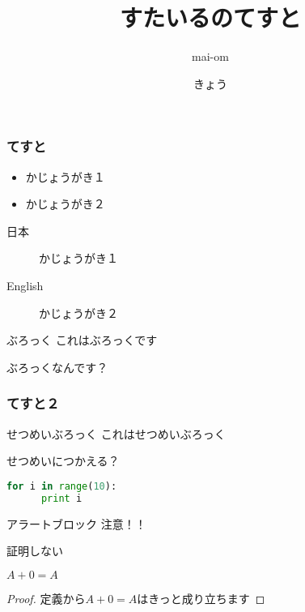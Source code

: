 \documentclass[17pt,aspectratio=1610,cjk, xelatex]{beamer}
\title{すたいるのてすと}
\author{mai-om}
\date{きょう}
\begin{document}
\maketitle{}

\begin{frame}
  \frametitle{てすと}
  
  \begin{itemize}
      \item かじょうがき１
      \item かじょうがき２
  \end{itemize}

  \begin{description}
      \item[日本] かじょうがき１
      \item[English] かじょうがき２
  \end{description}
  
  \begin{block}{ぶろっく}
    これはぶろっくです

    ぶろっくなんです？
  \end{block}
\end{frame}

\begin{frame}[fragile]
  \frametitle{てすと２}

  \begin{exampleblock}{せつめいぶろっく}
    これはせつめいぶろっく

    せつめいにつかえる？

\begin{lstlisting}[language=Python, basicstyle=\small\ttfamily]
  for i in range(10):
      print i
\end{lstlisting}
  \end{exampleblock}

  \begin{alertblock}{アラートブロック}
    注意！！
  \end{alertblock}

\end{frame}


\begin{frame}{証明しない}
\begin{theorem}
  $A + 0 = A$
\end{theorem}
\begin{proof}
  定義から$A + 0 = A$はきっと成り立ちます
\end{proof}
\end{frame}
\end{document}
